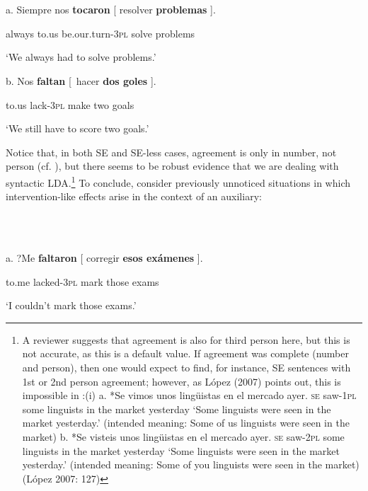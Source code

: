 \documentclass[output=paper]{langsci/langscibook}
\begin{document}
\ea%
    \label{ex:key:11}
    \gll\\
        \\
    \glt
    \z

            a.  Siempre   nos    \textbf{tocaron}              [ resolver  \textbf{problemas} ].

       always    to.us  be.our.turn-\textsc{3pl}  solve       problems

            ‘We always had to solve problems.’

    b.   Nos   \textbf{faltan}    [~hacer  \textbf{dos  goles} ].

        to.us  lack-\textsc{3pl}   make two goals

        ‘We still have to score two goals.’

Notice that, in both SE and SE-less cases, agreement is only in number, not person (cf. \citealt{Etxepare2005}), but there seems to be robust evidence that we are dealing with syntactic LDA.\footnote{A reviewer suggests that agreement is also for third person here, but this is not accurate, as this is a default value. If agreement was complete (number and person), then one would expect to find, for instance, SE sentences with 1st or 2nd person agreement; however, as López (2007) points out, this is impossible in :(i)  a.  *Se  vimos      unos  lingüistas en  el   mercado ayer.            \textsc{se}     saw-\textsc{1pl}  some linguists   in  the market    yesterday    ‘Some linguists were seen in the market yesterday.’      (intended meaning: Some of us linguists were seen in the market)  b.  *Se  visteis      unos  lingüistas en  el    mercado  ayer.          \textsc{se}  saw-\textsc{2pl}  some linguists   in  the  market     yesterday          ‘Some linguists were seen in the market yesterday.’     (intended meaning: Some of you linguists were seen in the market)    (López 2007: 127)} To conclude, consider previously unnoticed situations in which intervention-like effects arise in the context of an auxiliary: 

\ea%
    \label{ex:key:12}
    \gll\\
        \\
    \glt
    \z

          a.  ?Me       \textbf{faltaron}      [ corregir \textbf{esos   exámenes} ].

          to.me   lacked-\textsc{3pl}   mark      those exams

          ‘I couldn’t mark those exams.’
\end{document}
